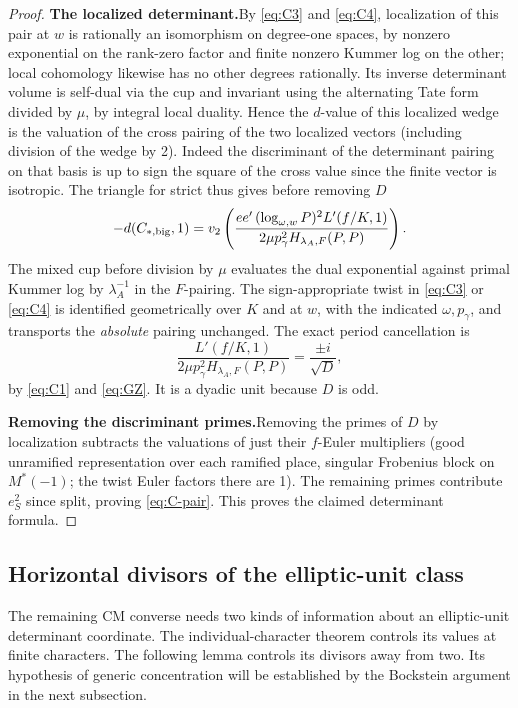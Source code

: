 \begin{proof}
\par\smallskip\noindent\textbf{The localized determinant.}\enspace By \eqref{eq:C3} and \eqref{eq:C4}, localization of
this pair at \(w\) is rationally an isomorphism on degree-one spaces, by nonzero exponential
on the rank-zero factor and finite nonzero Kummer log on the other; local cohomology likewise
has no other degrees rationally. Its inverse determinant volume is self-dual via the cup and
invariant using the alternating Tate form divided by \(\mu\), by integral local duality. Hence
the \(d\)-value of this localized wedge is the valuation of the cross pairing of the two
localized vectors (including division of the wedge by 2). Indeed the discriminant of the
determinant pairing on that basis is up to sign the square of the cross value since the finite
vector is isotropic. The triangle for strict thus gives before removing \(D\)
\[
   -d(C_{*,{\rm big}},1)
       =v_2\left(\frac{e e'\,(\log_{\omega,w}P)^2 L'(f/K,1)}
                              {2\mu p_\gamma^2 H_{\lambda_A,F}(P,P)}\right).
\]
The mixed cup before division by \(\mu\) evaluates the dual exponential against primal Kummer
log by \(\lambda_A^{-1}\) in the \(F\)-pairing. The sign-appropriate twist in \eqref{eq:C3} or
\eqref{eq:C4} is identified geometrically over \(K\) and at \(w\), with the indicated
\(\omega,p_\gamma\), and transports the \emph{absolute} pairing unchanged. The exact period
cancellation is
\[
 \frac{L'(f/K,1)}
      {2\mu p_\gamma^2H_{\lambda_A,F}(P,P)}
       =\frac{\pm i}{\sqrt D},
\]
by \eqref{eq:C1} and \eqref{eq:GZ}.
It is a dyadic unit because \(D\) is odd.

\par\smallskip\noindent\textbf{Removing the discriminant primes.}\enspace Removing the primes of \(D\) by localization
subtracts the valuations of just their \(f\)-Euler multipliers (good unramified representation
over each ramified place, singular Frobenius block on \(M^*(-1)\); the twist Euler factors
there are 1). The remaining primes contribute \(e_S^2\) since split, proving
\eqref{eq:C-pair}. This proves the claimed determinant formula.
\end{proof} 


\subsection{Horizontal divisors of the elliptic-unit class}

The remaining CM converse needs two kinds of information about an
elliptic-unit determinant coordinate. The individual-character theorem
controls its values at finite characters. The following lemma controls
its divisors away from two. Its hypothesis of generic concentration will
be established by the Bockstein argument in the next subsection.

